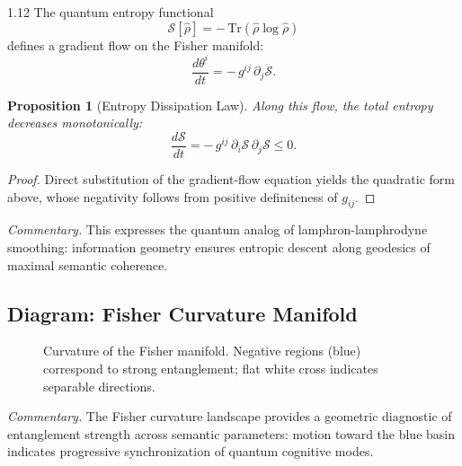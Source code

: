 \documentclass[12pt,a4paper]{article}
\numberwithin{equation}{section}
\newtheorem{proposition}{Proposition}[section]
\theoremstyle{remark}
\theoremstyle{definition}
\begin{document}
\begin{spacing}{1.12}
The quantum entropy functional
\[
\mathcal{S}[\hat{\rho}] = -\,\mathrm{Tr}(\hat{\rho}\log\hat{\rho})
\]
defines a gradient flow on the Fisher manifold:
\[
\frac{d\theta^i}{dt} = -\,g^{ij}\,\partial_j \mathcal{S}.
\]
\begin{proposition}[Entropy Dissipation Law]\label{prop:diss}
Along this flow, the total entropy decreases monotonically:
\[
\frac{d\mathcal{S}}{dt}
= -\,g^{ij}\,\partial_i \mathcal{S}\,\partial_j \mathcal{S} \le 0.
\]
\end{proposition}

\begin{proof}
Direct substitution of the gradient-flow equation yields the
quadratic form above, whose negativity follows from positive definiteness
of \(g_{ij}\).
\end{proof}

\noindent\textit{Commentary.}
This expresses the quantum analog of lamphron-lamphrodyne smoothing:
information geometry ensures entropic descent along geodesics of
maximal semantic coherence.

\subsection{Diagram: Fisher Curvature Manifold}

\begin{figure}[H]
\centering
{}
\caption{Curvature of the Fisher manifold.
Negative regions (blue) correspond to strong entanglement;
flat white cross indicates separable directions.}
\label{fig:fisher-curvature}
\end{figure}

\noindent\textit{Commentary.}
The Fisher curvature landscape provides a geometric diagnostic of
entanglement strength across semantic parameters:
motion toward the blue basin indicates
progressive synchronization of quantum cognitive modes.


\end{spacing}
\end{document}
